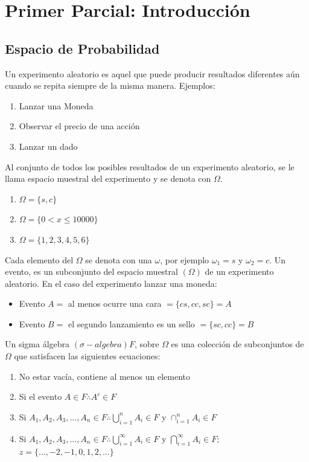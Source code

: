 \documentclass[11pt,fleqn]{book} %
\numberwithin{equation}{section} %
\numberwithin{figure}{section} %
\numberwithin{table}{section} %
\begin{document}
\chapter{Primer Parcial: Introducción}
\section{Espacio de Probabilidad}
Un experimento aleatorio es aquel que puede producir resultados diferentes aún cuando se repita siempre de la misma manera.
Ejemplos:
\begin{enumerate}
    \item Lanzar una Moneda
    \item Observar el precio de una acción
    \item Lanzar un dado
\end{enumerate}
Al conjunto de todos los posibles resultados de un experimento aleatorio, se le llama espacio muestral del experimento y se denota con $\Omega$.
\begin{enumerate}
    \item $\Omega = \{ s, c \}$
    \item $\Omega = \{ 0< x \leq 10000 \}$
    \item $\Omega = \{ 1,2,3,4,5,6 \}$
\end{enumerate}
Cada elemento del $\Omega$ se denota con una $\omega$, por ejemplo $\omega_{1} = s$ y $\omega_{2} = c$. Un evento, es un subconjunto del espacio muestral $(\Omega)$ de un experimento aleatorio. En el caso del experimento lanzar una moneda:
\begin{itemize}
    \item Evento $A =$ al menos ocurre una cara $= \{ cs,cc,sc \} = A$
    \item Evento $B =$ el  segundo lanzamiento es un sello $= \{ sc,cc \} = B$
\end{itemize}
Un sigma álgebra $(\sigma-algebra) F$, sobre $\Omega$ es una colección de subconjuntos de $\Omega$ que satisfacen las siguientes ecuaciones:
\begin{enumerate}
    \item No estar vacía, contiene al menos un elemento
    \item Si el evento $A \in F \therefore A^{c} \in F$
    \item Si $A_{1},A_{2},A_{3},...,A_{n} \in F \therefore 
    \bigcup_{i=1}^{n} A_{i} \in F$ y $\cap_{i=1}^{n} A_{i} \in F$
    \item Si $A_{1},A_{2},A_{3},...,A_{n} \in F \therefore 
    \bigcup_{i=1}^{\infty} A_{i} \in F$ y $\bigcap_{i=1}^{\infty} A_{i} \in F$; $z = \{ ...,-2,-1,0,1,2,... \}$
\end{enumerate}
\end{document}
